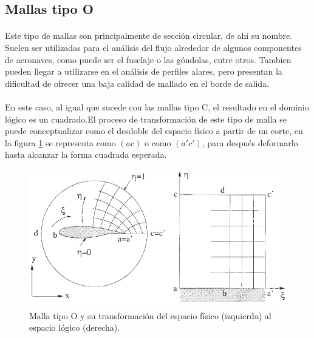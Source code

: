 \documentclass[letterpaper, openright, 12pt]{book}
\begin{document}
    \subsection{Mallas tipo O}
    \paragraph*{}
        Este tipo de mallas son principalmente de sección circular, de ahí su
        nombre. Suelen ser utilizadas para el análisis del flujo alrededor de
        algunos componentes de aeronaves, como puede ser el fuselaje o las
        góndolas, entre otros.\cite{vladimir-grid} Tambien pueden llegar a
        utilizarse en el análisis de perfiles alares, pero presentan la
        dificultad de ofrecer una baja calidad de mallado en el borde de salida.\cite{blazek}\cite{best-practices-grid-generation}
    \paragraph*{}
        En este caso, al igual que sucede con las mallas tipo C, el resultado en
        el dominio lógico es un cuadrado.El proceso de transformación de este
        tipo de malla se puede conceptualizar como el desdoble del espacio
        físico a partir de un corte, en la figura \ref{fig:malla-o} se
        representa como $(ac)$ o como $(a'c')$, para después deformarlo hasta
        alcanzar la forma cuadrada esperada.
            \begin{figure}[htbp!]
                \centering
                    \includegraphics[width=170mm]{./Imagenes/malla-o}
                    \captionsetup{justification=centering, margin=2cm}
                    \caption[Malla tipo O]{Malla tipo O y su transformación del
                    espacio físico (izquierda) al espacio lógico (derecha).\cite{blazek}}
                \label{fig:malla-o}
            \end{figure}
\end{document}
